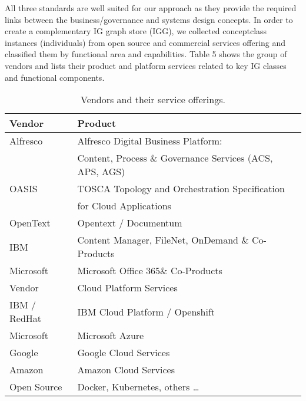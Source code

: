 %
All three standards are well suited for our approach as they provide the required links between the business/governance and systems design concepts. In order to create a complementary IG graph store (IGG), we collected concept\/class instances (individuals) from open source and commercial services offering and classified them by functional area and capabilities. Table 5 shows the group of vendors and lists their product and platform services related to key IG classes and functional components.
\begin{table}[h]
\caption{Vendors and their service offerings.}
\label{tab:example1} \centering
 \scalebox{0.55} {\begin{tabular}{|l|l|}
 \hline
  {Vendor} & {Product}\\
  \hline
  {Alfresco} & {Alfresco Digital Business Platform: \cite{AlfrescoECM}}\\
  { } & {Content, Process \& Governance Services (ACS, APS, AGS)}\\
  \hline
  {OASIS} & {TOSCA Topology and Orchestration Specification } \\
  {} & { for Cloud Applications \cite{TOSCA}} \\  
  \hline 
  {OpenText} & {Opentext / Documentum}\\
  \hline
  {IBM} & {Content Manager, FileNet, OnDemand \& Co-Products}\\
  \hline
  {Microsoft} & {Microsoft Office 365\& Co-Products \cite{MicrosoftECM}}\\
  \hline
  \hline
  {Vendor	} & {Cloud Platform Services}\\
  \hline
  {IBM / RedHat} & {IBM Cloud Platform / Openshift}\\
  \hline
  {Microsoft} & {Microsoft Azure}\\
  \hline
  {Google} & {Google Cloud Services}\\
  \hline
  {Amazon} & {Amazon Cloud Services}\\
  \hline
  {Open Source} &	{Docker, Kubernetes, others … }\\
  \hline
 \end{tabular}}
\end{table}
%
